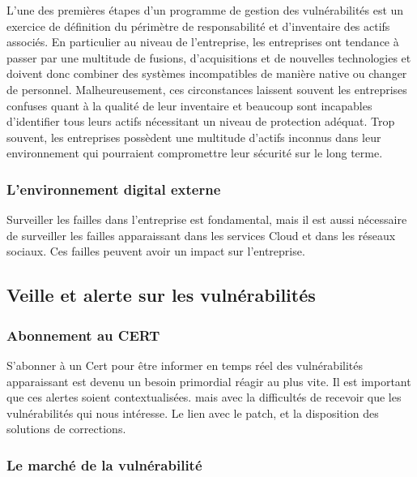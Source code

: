L'une des premières étapes d'un programme de gestion des vulnérabilités est un exercice de définition du périmètre de responsabilité et d'inventaire des actifs associés. En particulier au niveau de l'entreprise, les entreprises ont tendance à passer par une multitude de fusions, d'acquisitions et de nouvelles technologies et doivent donc combiner des systèmes incompatibles de manière native ou changer de personnel. Malheureusement, ces circonstances laissent souvent les entreprises confuses quant à la qualité de leur inventaire et beaucoup sont incapables d'identifier tous leurs actifs nécessitant un niveau de protection adéquat. Trop souvent, les entreprises possèdent une multitude d'actifs inconnus dans leur environnement qui pourraient compromettre leur sécurité sur le long terme.

\subsubsection{L’environnement digital externe}


Surveiller les failles dans l'entreprise est fondamental, mais il est aussi nécessaire de surveiller les failles apparaissant dans les services Cloud et dans les réseaux sociaux. Ces failles peuvent avoir un impact sur l'entreprise.

\subsection{Veille et alerte sur les vulnérabilités}

\subsubsection{Abonnement au CERT}

S’abonner à un Cert pour être informer en temps réel des vulnérabilités apparaissant est devenu un besoin primordial réagir au plus vite. Il est important que ces alertes soient contextualisées.  mais avec la difficultés de recevoir que les vulnérabilités qui nous intéresse. Le lien avec le patch, et la disposition des solutions de corrections.

\subsubsection{Le marché de la vulnérabilité}

